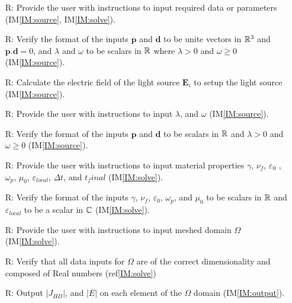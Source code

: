 \documentclass[12pt]{article}
\newcounter{reqnum} %
\begin{document}
	\noindent \begin{itemize}
		
		\item[R\refstepcounter{reqnum}\thereqnum \label{R_1}:] Provide the user
		with instructions to input required data or parameters  (IM\ref{IM:source}, IM\ref{IM:solve}).
		
		\item[R\refstepcounter{reqnum}\thereqnum \label{R_2}:] Verify the
		format of the inputs $\textbf{p}$ and $\textbf{d}$ to be unite vectors in $\Bbb R^3$
		and $\textbf{p}\textbf{.}\textbf{d}=0$, and $\lambda$ and $\omega$ to be scalars in $\Bbb R$ where $\lambda > 0$ and $\omega \geqslant 0$ (IM\ref{IM:source}).
		
		\item[R\refstepcounter{reqnum}\thereqnum \label{R_3}:] Calculate the
		electric field of the light source $\textbf{E}_i$ to setup the light source
		(IM\ref{IM:source}).
		
		\item[R\refstepcounter{reqnum}\thereqnum \label{R_4}:] Provide the user
		with instructions to input $\lambda$, and $\omega$ (IM\ref{IM:source}).
		
		\item[R\refstepcounter{reqnum}\thereqnum \label{R_5}:] Verify the
		format of the inputs $\textbf{p}$ and $\textbf{d}$ to be scalars in $\Bbb R$ and
		$\lambda>0$ and $\omega \geqslant0$ (IM\ref{IM:source}).
		
		\item[R\refstepcounter{reqnum}\thereqnum \label{R_6}:] Provide the
		user with instructions to input material properties $\gamma$, $\nu_f$,
		$\varepsilon_0$ , $\omega_p$, $\mu_{0}$, $\varepsilon_{local}$, $\Delta t$, and
		$t_final$ (IM\ref{IM:solve}).
		
		\item[R\refstepcounter{reqnum}\thereqnum \label{R_7}:] Verify
		the format of the inputs $\gamma$, $\nu_f$, $\varepsilon_0$, $\omega_p$, and
		$\mu_{0}$ to be scalars in $\Bbb R$ and $\varepsilon_{local}$ to be a scalar in
		$\Bbb C$ (IM\ref{IM:solve}).
		
		\item[R\refstepcounter{reqnum}\thereqnum \label{R_8}:] Provide the user
		with instructions to input meshed domain $\Omega$ (IM\ref{IM:solve}).
		
		\item[R\refstepcounter{reqnum}\thereqnum \label{R_9}:] Verify that all data
		inputs for $\Omega$ are of the correct dimensionality and composed of Real
		numbers (ref\ref{IM:solve})
		
		
		\item[R\refstepcounter{reqnum}\thereqnum \label{R_10}:] Output $|J_{HD}|$, and
		$|E|$ on each element of the $\Omega$ domain (IM\ref{IM:output}).
		
		
	\end{itemize}
	
\end{document}
